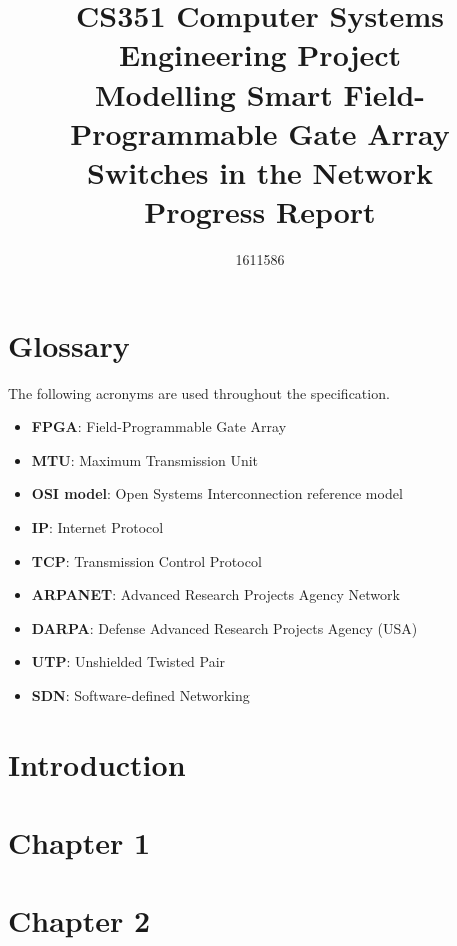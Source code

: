 \documentclass[12pt, a4paper, twoside, onecolumn]{article}
\title{CS351 Computer Systems Engineering Project \\ \vspace{0.5cm} Modelling Smart Field-Programmable Gate Array Switches in the Network \\ \vspace{0.3cm} \Large{Progress Report}}
\author{1611586}
\begin{document}


\tableofcontents
\newpage

\section{Glossary}
\label{glossary}
The following acronyms are used throughout the specification.
\begin{itemize}
  \item \textbf{FPGA}: Field-Programmable Gate Array
  \item \textbf{MTU}: Maximum Transmission Unit
  \item \textbf{OSI model}: Open Systems Interconnection reference model
  \item \textbf{IP}: Internet Protocol
  \item \textbf{TCP}: Transmission Control Protocol
  \item \textbf{ARPANET}: Advanced Research Projects Agency Network
  \item \textbf{DARPA}: Defense Advanced Research Projects Agency (USA)
  \item \textbf{UTP}: Unshielded Twisted Pair
  \item \textbf{SDN}: Software-defined Networking
\end{itemize}

\section{Introduction}
\label{introduction}

\section{Chapter 1}
\label{chapter_1}

\section{Chapter 2}
\label{chapter_2}

\cite{rfc1149}




\begin{appendices}
  
\end{appendices}
\end{document}
